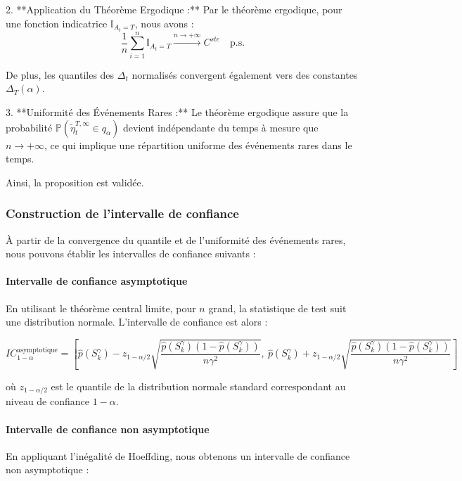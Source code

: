 \documentclass[12pt,a4paper]{article}
\theoremstyle{definition}
\theoremstyle{remark}
\begin{document}
2. **Application du Théorème Ergodique :** 
   Par le théorème ergodique, pour une fonction indicatrice $\mathbb{I}_{A_t = T}$, nous avons :
   $$
   \frac{1}{n} \sum_{i=1}^n \mathbb{I}_{A_t = T} \xrightarrow{n \to +\infty} C^{ste} \quad \text{p.s.}
   $$
   
   De plus, les quantiles des $\Delta_t$ normalisés convergent également vers des constantes $\Delta_T(\alpha)$.

3. **Uniformité des Événements Rares :**
   Le théorème ergodique assure que la probabilité $\mathbb{P}\left(\tilde{\eta}_t^{T,\infty} \in q_{\alpha}\right)$ devient indépendante du temps à mesure que $n \to +\infty$, ce qui implique une répartition uniforme des événements rares dans le temps.

Ainsi, la proposition est validée.

\subsubsection{Construction de l'intervalle de confiance}

À partir de la convergence du quantile et de l'uniformité des événements rares, nous pouvons établir les intervalles de confiance suivants :

\paragraph{Intervalle de confiance asymptotique}

En utilisant le théorème central limite, pour $n$ grand, la statistique de test suit une distribution normale. L'intervalle de confiance est alors :

$$
IC_{1 - \alpha}^{\text{asymptotique}} = \left[ \hat{p}(S_k^{\gamma}) - z_{1 - \alpha/2} \sqrt{\frac{\hat{p}(S_k^{\gamma})(1 - \hat{p}(S_k^{\gamma}))}{n \gamma^2}}, \ \hat{p}(S_k^{\gamma}) + z_{1 - \alpha/2} \sqrt{\frac{\hat{p}(S_k^{\gamma})(1 - \hat{p}(S_k^{\gamma}))}{n \gamma^2}} \right]
$$

où $z_{1 - \alpha/2}$ est le quantile de la distribution normale standard correspondant au niveau de confiance $1 - \alpha$.

\paragraph{Intervalle de confiance non asymptotique}

En appliquant l'inégalité de Hoeffding, nous obtenons un intervalle de confiance non asymptotique :
\end{document}
